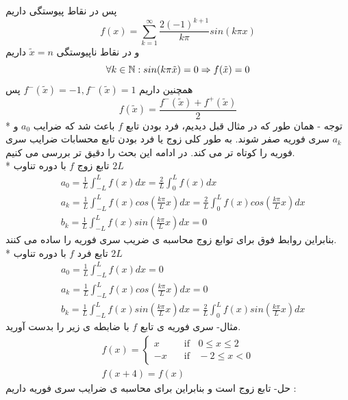 پس در نقاط پیوستگی داریم
\[
f(x)=\sum_{k=1}^{\infty}{\frac{2(-1)^{k+1}}{k\pi}sin(k\pi x)}
\]
و در نقاط ناپیوستگی
$\tilde{x}=n$
داریم 
\[
\forall k\in\mathbb{N}: sin(k\pi \tilde{x})=0\Rightarrow f(\tilde{x})=0
\]
همچنین داریم
$f^-\left(\tilde{x}\right)=-1 ,f^-\left(\tilde{x}\right)=1$
پس
\[
f\left(\tilde{x}\right)=\frac{f^-\left(\tilde{x}\right)+f^+\left(\tilde{x}\right)}{2}
\]
* توجه - همان طور که در مثال قبل دیدیم، فرد بودن تابع 
$f$
باعث شد که ضرایب
$a_0$
و 
$a_k$
سری فوریه صفر شوند. به طور کلی زوج یا فرد بودن تابع محسابات ضرایب سری فوریه را کوتاه تر می کند. در ادامه این بحث را دقیق تر بررسی می کنیم.\\
* تابع زوج 
$f$
با دوره تناوب
$2L$
\begin{equation*}
	\begin{aligned}
		{} &\
		a_0=\frac{1}{L}\int_{-L}^L{f(x)dx}=\frac{2}{L}\int_{0}^L{f(x)dx}
		\\ &\
		a_k=\frac{1}{L}\int_{-L}^L{f(x)cos\left(\frac{k\pi}{L}x\right)dx}=\frac{2}{L}\int_{0}^L{f(x)cos\left(\frac{k\pi}{L}x\right)dx}
		\\ &\
		b_k=\frac{1}{L}\int_{-L}^L{f(x)sin\left(\frac{k\pi}{L}x\right)dx}=0
	\end{aligned}
\end{equation*}
بنابراین روابط فوق برای توابع زوج محاسبه ی ضریب سری فوریه را ساده می کنند.\\
* تابع فرد 
$f$
با دوره تناوب 
$2L$
\begin{equation*}
	\begin{aligned}
		{} &\
		a_0=\frac{1}{L}\int_{-L}^L{f(x)dx}=0
		\\ &\
		a_k=\frac{1}{L}\int_{-L}^L{f(x)cos\left(\frac{k\pi}{L}x\right)dx}=0
		\\ &\
		b_k=\frac{1}{L}\int_{-L}^L{f(x)sin\left(\frac{k\pi}{L}x\right)dx}=\frac{2}{L}\int_{0}^L{f(x)sin\left(\frac{k\pi}{L}x\right)dx}
	\end{aligned}
\end{equation*}
مثال- سری فوریه ی تابع
$f$
با ضابطه ی زیر را بدست آورید.
\begin{equation*}
	\begin{gathered}
		f(x) =
		\begin{cases}
			x       & \quad \text{if }\;\; 0\le x\le 2 \\
			-x  & \quad \text{if }\;\; -2\le x< 0
		\end{cases}\\
		f(x+4)=f(x)
	\end{gathered}
\end{equation*}
حل- تابع زوج است و بنابراین برای محاسبه ی ضرایب سری فوریه داریم :
